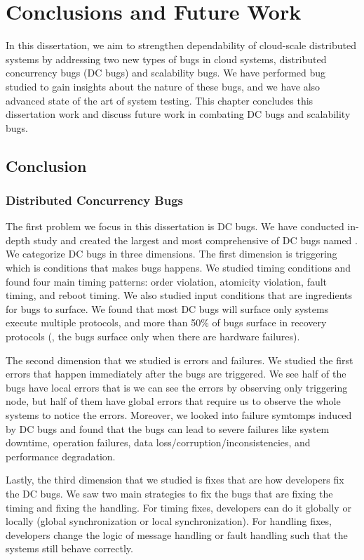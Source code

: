 \chapter{Conclusions and Future Work}
\label{chp-con}

In this dissertation, we aim to strengthen dependability of cloud-scale
distributed systems by addressing two new types of bugs in cloud systems,
distributed concurrency bugs (DC bugs) and scalability bugs. We have performed
bug studied to gain insights about the nature of these bugs, and we have also
advanced state of the art of system testing. This chapter concludes this
dissertation work and discuss future work in combating DC bugs and scalability
bugs.

\section{Conclusion}

\subsection{Distributed Concurrency Bugs}

The first problem we focus in this dissertation is DC bugs. We have conducted
in-depth study and created the largest and most comprehensive of DC bugs named
\taxdc. We categorize DC bugs in three dimensions. The first dimension is
triggering which is conditions that makes bugs happens. We studied timing
conditions and found four main timing patterns: order violation, atomicity
violation, fault timing, and reboot timing. We also studied input conditions
that are ingredients for bugs to surface. We found that most DC bugs will
surface only systems execute multiple protocols, and more than 50\% of bugs
surface in recovery protocols (\ie, the bugs surface only when there are
hardware failures).

The second dimension that we studied is errors and failures. We studied the
first errors that happen immediately after the bugs are triggered. We see half
of the bugs have local errors that is we can see the errors by observing only
triggering node, but half of them have global errors that require us to observe
the whole systems to notice the errors. Moreover, we looked into failure
symtomps induced by DC bugs and found that the bugs can lead to severe failures
like system downtime, operation failures, data loss/corruption/inconsistencies,
and performance degradation.

Lastly, the third dimension that we studied is fixes that are how developers fix
the DC bugs. We saw two main strategies to fix the bugs that are fixing the
timing and fixing the handling. For timing fixes, developers can do it globally or
locally (global synchronization or local synchronization). For handling fixes,
developers change the logic of message handling or fault handling such that the
systems still behave correctly.

